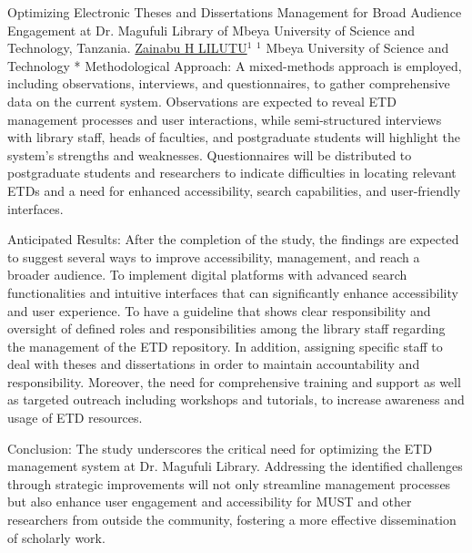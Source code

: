 \begin{abstract_online}{Optimizing Electronic Theses and Dissertations Management for Broad Audience Engagement at Dr. Magufuli Library of Mbeya University of Science and Technology, Tanzania.}{%
    \underline{Zainabu H LILUTU}$^{1}$}{%
}{%
    $^1$ Mbeya University of Science and Technology *\newline{}
}
Methodological Approach: A mixed-methods approach is employed, including observations, interviews, and questionnaires, to gather comprehensive data on the current system. Observations are expected to reveal ETD management processes and user interactions, while semi-structured interviews with library staff, heads of faculties, and postgraduate students will highlight the system's strengths and weaknesses. Questionnaires will be distributed to postgraduate students and researchers to indicate difficulties in locating relevant ETDs and a need for enhanced accessibility, search capabilities, and user-friendly interfaces.

Anticipated Results: After the completion of the study, the findings are expected to suggest several ways to improve accessibility, management, and reach a broader audience. To implement digital platforms with advanced search functionalities and intuitive interfaces that can significantly enhance accessibility and user experience. To have a guideline that shows clear responsibility and oversight of defined roles and responsibilities among the library staff regarding the management of the ETD repository. In addition, assigning specific staff to deal with theses and dissertations in order to maintain accountability and responsibility. Moreover, the need for comprehensive training and support as well as targeted outreach including workshops and tutorials, to increase awareness and usage of ETD resources.

Conclusion: The study underscores the critical need for optimizing the ETD management system at Dr. Magufuli Library. Addressing the identified challenges through strategic improvements will not only streamline management processes but also enhance user engagement and accessibility for MUST and other researchers from outside the community, fostering a more effective dissemination of scholarly work.

\end{abstract_online}

